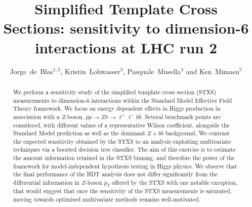 \documentclass[11pt]{cernrep}
\begin{document}
\title{
Simplified Template Cross Sections: sensitivity to dimension-6 interactions at LHC run 2}
\author{Jorge~de~Blas$^{1,2}$,
Kristin~Lohwasser$^3$, Pasquale~Musella$^4$ and Ken~Mimasu$^5$}
\maketitle

\begin{abstract}
We perform a sensitivity study of the simplified template cross section (STXS) measurements to dimension-6 interactions within the Standard Model Effective Field Theory framework. We focus on energy dependent effects in Higgs production in association with a $Z$-boson, $p p \to Z h \to \ell^+\ell^- b\bar{b}$. Several benchmark points are considered, with different values of a representative Wilson coefficient, alongside the Standard Model prediction as well as the dominant $Z+b\bar{b}$ background. We contrast the expected sensitivity obtained by the STXS to an analysis exploiting multivariate techniques via a boosted decision tree classifier. The aim of this exercise is to estimate the amount information retained in the STXS binning, and therefore the power of the framework for model-independent hypothesis testing in Higgs physics. We observe that the final performance of the BDT analysis does not differ significantly from the differential information in $Z$-boson $p_T$ offered by the STXS with one notable exception, that would suggest  that once the sensitivity of the STXS measurements is saturated, moving towards optimised multivariate methods remains well-motivated. 
\end{abstract}


\newpage
\end{document}
